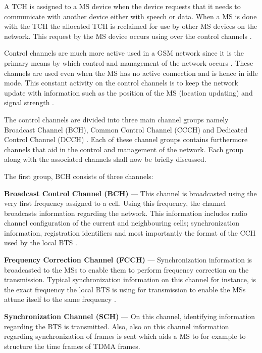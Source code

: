 A TCH is assigned to a MS device when the device requests that it needs to communicate with another device either with speech or data. When a MS is done with the TCH the allocated TCH is reclaimed for use by other MS devices on the network. This request by the MS device occurs using over the control channels \cite{GSMArchitectureProtocolsServices}.

Control channels are much more active used in a GSM network since it is the primary means by which control and management of the network occurs \cite{GSMArchitectureProtocolsServices}. These channels are used even when the MS has no active connection and is hence in idle mode. This constant activity on the control channels is to keep the network update with information such as the position of the MS (location updating) and signal strength \cite{GSMArchitectureProtocolsServices,GSMSysEngin,Eisenblatter}. 

The control channels are divided into three main channel groups namely Broadcast Channel (BCH), Common Control Channel (CCCH) and Dedicated Control Channel (DCCH) \cite{GSMArchitectureProtocolsServices}. Each of these channel groups contains furthermore channels that aid in the control and management of the network. Each group along with the associated channels shall now be briefly discussed.

The first group, BCH consists of three channels:
\begin{description}
\item{\textbf{Broadcast Control Channel (BCH)}} --- This channel is broadcasted using the very first frequency assigned to a cell. Using this frequency, the channel broadcasts information regarding the network. This information includes radio channel configuration of the current and neighbouring cells; synchronization information, registration identifiers and most importantly the format of the CCH used by the local BTS \cite{GSMArchitectureProtocolsServices}.
\item{\textbf{Frequency Correction Channel (FCCH)}} --- Synchronization information is broadcasted to the MSs to enable them to perform frequency correction on the transmission. Typical synchronization information on this channel for instance, is the exact frequency the local BTS is using for transmission to enable the MSs attune itself to the same frequency \cite{GSMArchitectureProtocolsServices}.
\item{\textbf{Synchronization Channel (SCH)}} --- On this channel, identifying information regarding the BTS is transmitted. Also, also on this channel information regarding synchronization of frames is sent which aids a MS to for example to structure the time frames of TDMA frames.
\end{description}


